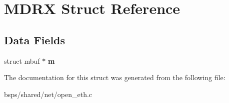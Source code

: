 \hypertarget{structMDRX}{}\section{M\+D\+RX Struct Reference}
\label{structMDRX}
\subsection*{Data Fields}
\begin{DoxyCompactItemize}
\item 
\mbox{\label{structMDRX_a0c96b384779c1b824d9aa88e37cfd807}} 
struct mbuf $\ast$ {\bfseries m}
\end{DoxyCompactItemize}


The documentation for this struct was generated from the following file\+:\begin{DoxyCompactItemize}
\item 
bsps/shared/net/open\+\_\+eth.\+c\end{DoxyCompactItemize}
